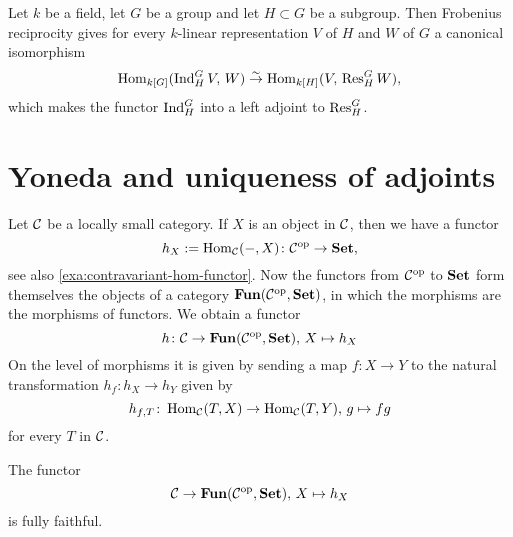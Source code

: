\begin{example}
Let $k$ be a field,  let $G$ be a group and let $H\subset G$ be a subgroup. Then Frobenius reciprocity gives for every $k$-linear representation $V$ of $H$ and $W$ of $G$ a canonical isomorphism
\[
	\operatorname{Hom}_{{k[G]}}( \operatorname{Ind}^G_H V,\, W ) \overset{\sim}{\to} \operatorname{Hom}_{{k[H]}}( V,\, \operatorname{Res}^G_H W ),
\]
which makes the functor $\operatorname{Ind}^G_H$ into a left adjoint to $\operatorname{Res}^G_H$.
\end{example}


\section{Yoneda and uniqueness of adjoints}
Let ${\mathcal{C}}$ be a locally small category.
If $X$ is an object in ${\mathcal{C}}$, then we have a functor 
\[
	h_X := \operatorname{Hom}_{\mathcal{C}}(-,X)\colon {\mathcal{C}}^{\mathrm{op}} \to \mathbf{Set},
\]
see also \ref{exa:contravariant-hom-functor}.
Now the  functors from ${\mathcal{C}}^{\mathrm{op}}$ to $\mathbf{Set}$ form themselves the objects of a category $\mathbf{Fun}({\mathcal{C}}^{\mathrm{op}},\mathbf{Set})$, in which the morphisms are the morphisms of functors. We obtain a functor
\[
	h\colon {\mathcal{C}} \to \mathbf{Fun}({\mathcal{C}}^{\mathrm{op}},\mathbf{Set}),\, X \mapsto h_X
\]
On the level of morphisms it is given by sending a map $f\colon X \to Y$ to the natural transformation $h_f\colon h_X \to h_Y$ given by
\[
	h_{f,T}\colon \operatorname{Hom}_{\mathcal{C}}(T,X) \to \operatorname{Hom}_{\mathcal{C}}(T,Y),\, g \mapsto fg
\]
for every $T$ in ${\mathcal{C}}$.

\begin{theorem}\label{thm:yoneda}
The functor
\[
	{\mathcal{C}} \to \mathbf{Fun}({\mathcal{C}}^{\mathrm{op}},\mathbf{Set}),\, X \mapsto h_X
\]
is fully faithful. 
\end{theorem}

